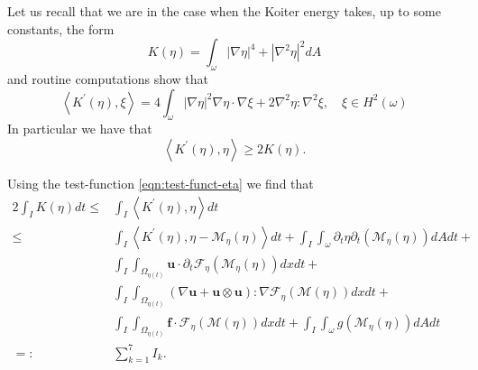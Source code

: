 \documentclass[10pt,a4paper]{article}
\numberwithin{equation}{section}
\begin{document}
Let us recall  that we are in the case when the Koiter energy takes, up to some constants, the form \[K\left(\eta\right)=\int_{\omega}\left|\nabla\eta\right|^{4}+\left|\nabla^{2}\eta\right|^{2}dA\] and routine computations show that
 \[
\left\langle K^{\prime}\left(\eta\right),\xi\right\rangle =4\int_{\omega}\left|\nabla\eta\right|^{2}\nabla\eta\cdot\nabla\xi+2\nabla^{2}\eta:\nabla^{2}\xi,\quad\xi\in H^{2}\left(\omega\right)
 \] In particular we have that 
 \[\left\langle K^{\prime}\left(\eta\right),\eta\right\rangle \ge2K\left(\eta\right).\]

Using the test-function \eqref{eqn:test-funct-eta} we find that
\begin{equation}
\begin{aligned}2\int_{I}K\left(\eta\right)dt\leq & \int_{I}\left\langle K^{\prime}\left(\eta\right),\eta\right\rangle dt\\
\leq & \int_{I}\left\langle K^{\prime}\left(\eta\right),\eta-\mathcal{M}_{\eta}\left(\eta\right)\right\rangle dt+\int_{I}\int_{\omega}\partial_{t}\eta\partial_{t}\left(\mathcal{M}_{\eta}\left(\eta\right)\right)dAdt+\\
 & \int_{I}\int_{\Omega_{\eta\left(t\right)}}\mathbf{u}\cdot\partial_{t}\mathcal{F}_{\eta}\left(\mathcal{M}_{\eta}\left(\eta\right)\right)dxdt+\\
 & \int_{I}\int_{\Omega_{\eta\left(t\right)}}\left(\nabla\mathbf{u}+\mathbf{u}\otimes\mathbf{u}\right):\nabla\mathcal{F}_{\eta}\left(\mathcal{M}\left(\eta\right)\right)dxdt+\\
 & \int_{I}\int_{\Omega_{\eta\left(t\right)}}\mathbf{f}\cdot\mathcal{F}_{\eta}\left(\mathcal{M}\left(\eta\right)\right)dxdt+\int_{I}\int_{\omega}g\left(\mathcal{M}_{\eta}\left(\eta\right)\right)dAdt\\
  =:&\sum_{k=1}^{7}I_{k}.
\end{aligned}
\end{equation}
\end{document}
